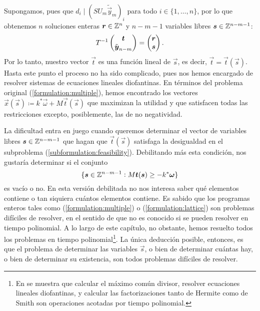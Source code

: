 Supongamos, pues que $d_i \mid (SU_m\tilde{\vec{y}}_{m})_i$ para todo $i \in \lbrace 1, \ldots,
n\rbrace$, por lo que obtenemos $n$ soluciones enteras $\boldsymbol{r} \in \mathbb{Z}^n$ y $n - m - 1$ variables
libres $\boldsymbol{s} \in \mathbb{Z}^{n-m-1}$:
\begin{equation*}
	T^{-1}\begin{pmatrix} \boldsymbol{t} \\ \tilde{\boldsymbol{y}}_{n-m} \end{pmatrix}
	=
	\begin{pmatrix} \boldsymbol{r} \\ \boldsymbol{s} \end{pmatrix}.
\end{equation*}
Por lo tanto, nuestro vector $\vec{t}$ es una función lineal de $\vec{s}$, es decir, $\vec{t} =
\vec{t}(\vec{s})$. Hasta este punto el proceso no ha sido complicado, pues nos hemos encargado de
resolver sistemas de ecuaciones lineales diofantinas. En términos del problema original
(\ref{formulation:multiple}), hemos encontrado los vectores $\vec{x}(\vec{s}) \coloneq
k^*\vec{\omega} + M\vec{t}(\vec{s})$ que maximizan la utilidad y que satisfacen todas las
restricciones excepto, posiblemente, las de no negatividad.

La dificultad entra en juego cuando queremos determinar el vector de variables libres $\boldsymbol{s} \in
\mathbb{Z}^{n-m-1}$ que hagan que $\vec{t}(\vec{s})$ satisfaga la desigualdad en el subproblema
(\ref{subformulation:feasibility}). Debilitando más esta condición, nos gustaría determinar si el
conjunto
\begin{equation*}
	\lbrace \boldsymbol{s} \in \mathbb{Z}^{n-m-1} \vcentcolon M\boldsymbol{t}(\boldsymbol{s}) \geq -k^*\boldsymbol{\omega} \rbrace
\end{equation*}
es vacío o no. En esta versión debilitada no nos interesa saber qué elementos contiene o tan
siquiera cuántos elementos contiene. Es sabido que los programas enteros tales como
(\ref{formulation:multiple}) o (\ref{formulation:lattice}) son problemas difíciles de resolver, en
el sentido de que no es conocido si se pueden resolver en tiempo polinomial. A lo largo de este
capítulo, no obstante, hemos resuelto todos los problemas en tiempo polinomial\footnote{En
	\cite{alex} se muestra que calcular el máximo común divisor, resolver ecuaciones lineales
	diofantinas, y calcular las factorizaciones tanto de Hermite como de Smith son operaciones
	acotadas por tiempo polinomial.}.
La única deducción posible, entonces, es que el problema de determinar las variables $\vec{s}$, o
bien de determinar cuántas hay, o bien de determinar su existencia, son todos problemas difíciles de
resolver.

